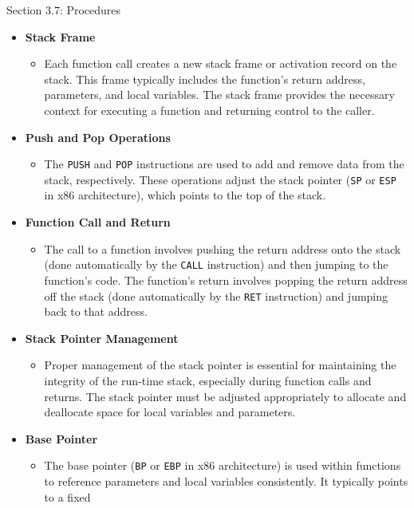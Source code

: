 \begin{notes}{Section 3.7: Procedures}
    \begin{itemize}
        \item \textbf{Stack Frame}
        \begin{itemize}
            \item Each function call creates a new stack frame or activation record on the stack. This frame typically includes the function's return address, parameters, and local variables. The stack 
            frame provides the necessary context for executing a function and returning control to the caller.
        \end{itemize}
        \item \textbf{Push and Pop Operations}
        \begin{itemize}
            \item The \texttt{PUSH} and \texttt{POP} instructions are used to add and remove data from the stack, respectively. These operations adjust the stack pointer (\texttt{SP} or \texttt{ESP} 
            in x86 architecture), which points to the top of the stack.
        \end{itemize}
        \item \textbf{Function Call and Return}
        \begin{itemize}
            \item The call to a function involves pushing the return address onto the stack (done automatically by the \texttt{CALL} instruction) and then jumping to the function's code. The function's 
            return involves popping the return address off the stack (done automatically by the \texttt{RET} instruction) and jumping back to that address.
        \end{itemize}
        \item \textbf{Stack Pointer Management}
        \begin{itemize}
            \item Proper management of the stack pointer is essential for maintaining the integrity of the run-time stack, especially during function calls and returns. The stack pointer must be 
            adjusted appropriately to allocate and deallocate space for local variables and parameters.
        \end{itemize}
        \item \textbf{Base Pointer}
        \begin{itemize}
            \item The base pointer (\texttt{BP} or \texttt{EBP} in x86 architecture) is used within functions to reference parameters and local variables consistently. It typically points to a fixed 

\end{itemize}
\end{itemize}
\end{notes}
